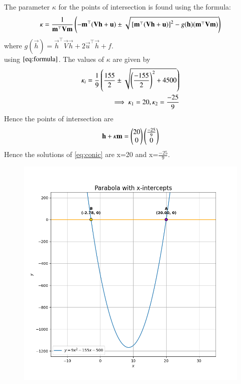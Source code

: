 \documentclass[journal]{IEEEtran}
\begin{document}
The parameter $\kappa$ for the points of intersection is found using the formula:
\begin{align}
\kappa = \frac{1}{\mathbf{m}^\top \mathbf{V} \mathbf{m}}\left(-\mathbf{m}^\top(\mathbf{V}\mathbf{h}+\mathbf{u}) \pm \sqrt{{}\left[\mathbf{m}^\top(\mathbf{V}\mathbf{h}+\mathbf{u})\right]^2 - g(\mathbf{h})(\mathbf{m}^\top \mathbf{V} \mathbf{m})}\right)\label{eq:formula}
\end{align}
where $g(\vec{h}) = \vec{h}^\top \vec{V} \vec{h} + 2\vec{u}^\top \vec{h} + f$.\\
using $\eqref{eq:formula}$. The values of $\kappa$ are given by
\begin{align}
    \kappa_i=\frac{1}{9}\left(\frac{155}{2}\pm\sqrt{\left(\frac{-155}{2}\right)^{2}+4500}\right)\\
    \implies \kappa_1=20,\kappa_2=\frac{-25}{9}
\end{align}
Hence the points of intersection are
\begin{align}
    \mathbf{h}+\kappa\mathbf{m}=\begin{pmatrix}20\\0\end{pmatrix}\begin{pmatrix}\frac{-25}{9}\\0\end{pmatrix}
\end{align}
Hence the solutions of \eqref{eq:conic} are x=20 and x=$\frac{-25}{9}$.
    \begin{figure}[H]
    \centering
    \includegraphics[width=0.7\columnwidth]{figs/Figure_1.png}
    \label{fig:placeholder}
    \caption{}
\end{figure}
\end{document}
